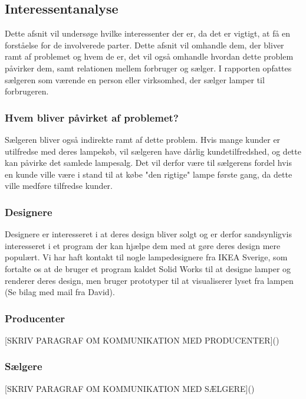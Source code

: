 \subsection{Interessentanalyse}
Dette afsnit vil undersøge hvilke interessenter der er, da det er vigtigt, at få en forståelse for de involverede parter. Dette afsnit vil omhandle dem, der bliver ramt af problemet og hvem de er, det vil også omhandle hvordan dette problem påvirker dem, samt relationen mellem forbruger og sælger. I rapporten opfattes sælgeren som værende en person eller virksomhed, der sælger lamper til forbrugeren. 

\subsubsection{Hvem bliver påvirket af problemet?}


Sælgeren bliver også indirekte ramt af dette problem. Hvis mange kunder er utilfredse med deres lampekøb, vil sælgeren have dårlig kundetilfredshed, og dette kan påvirke det samlede lampesalg. Det vil derfor være til sælgerens fordel hvis en kunde ville være i stand til at købe "den rigtige" lampe første gang, da dette ville medføre tilfredse kunder.


\subsubsection{Designere}
Designere er interesseret i at deres design bliver solgt og er derfor sandsynligvis interesseret i et program der kan hjælpe dem med at gøre deres design mere populært.
Vi har haft kontakt til nogle lampedesignere fra IKEA Sverige, som fortalte os at de bruger et program kaldet Solid Works til at designe lamper og renderer deres design, men bruger prototyper til at visualiserer lyset fra lampen (Se bilag med mail fra David).

\subsubsection{Producenter}
[SKRIV PARAGRAF OM KOMMUNIKATION MED PRODUCENTER]()
\subsubsection{Sælgere}
[SKRIV PARAGRAF OM KOMMUNIKATION MED SÆLGERE]()
